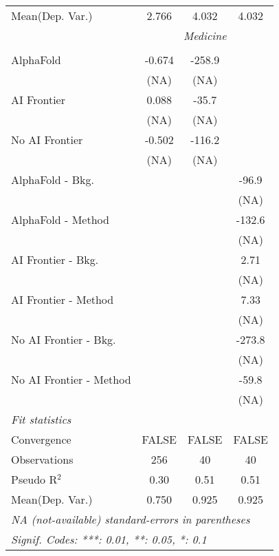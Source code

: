 \begin{tabular}{lccc}
Mean(Dep. Var.) & 2.766 & 4.032 & 4.032 \\
 & \multicolumn{3}{c}{\textit{Medicine}} \\ \\
   AlphaFold               & -0.674 & -258.9 &   \\   
                           & (NA)   & (NA)   &   \\   
   AI Frontier             & 0.088  & -35.7  &   \\   
                           & (NA)   & (NA)   &   \\   
   No AI Frontier          & -0.502 & -116.2 &   \\   
                           & (NA)   & (NA)   &   \\   
   AlphaFold - Bkg.        &        &        & -96.9\\   
                           &        &        & (NA)\\   
   AlphaFold - Method      &        &        & -132.6\\   
                           &        &        & (NA)\\   
   AI Frontier - Bkg.      &        &        & 2.71\\   
                           &        &        & (NA)\\   
   AI Frontier - Method    &        &        & 7.33\\   
                           &        &        & (NA)\\   
   No AI Frontier - Bkg.   &        &        & -273.8\\   
                           &        &        & (NA)\\   
   No AI Frontier - Method &        &        & -59.8\\   
                           &        &        & (NA)\\   
   \midrule
   \emph{Fit statistics}\\
   Convergence             &FALSE   & FALSE  & FALSE\\  
   Observations            & 256    & 40     & 40\\  
   Pseudo R$^2$            & 0.30   & 0.51   & 0.51\\  
Mean(Dep. Var.) & 0.750 & 0.925 & 0.925 \\
   \midrule \midrule
   \multicolumn{4}{l}{\emph{NA (not-available) standard-errors in parentheses}}\\
   \multicolumn{4}{l}{\emph{Signif. Codes: ***: 0.01, **: 0.05, *: 0.1}}\\
\end{tabular}
\par\endgroup
